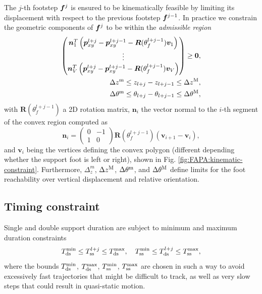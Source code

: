 The $j$-th footstep ${\bm{f}}^{j}$ is ensured to be kinematically feasible by limiting its displacement with respect to the previous footstep ${\bm{f}}^{j-1}$. In practice we constrain the geometric components of ${\bm{f}}^{j}$ to be within the \textit{admissible region}
\begin{equation}
\label{eq:FAPA:kinematic-constraint}
\begin{split}
\begin{pmatrix}
    \bm{n}_1^T\left(\bm{p}_{xy}^{l+j} - \bm{p}_{xy}^{l+j-1} - \bm{R}(\theta_f^{l+j-1})\bm{v}_1\right) \\
    \vdots \\
    \bm{n}_V^T\left(\bm{p}_{xy}^{l+j} - \bm{p}_{xy}^{l+j-1} - \bm{R}(\theta_f^{l+j-1})\bm{v}_V\right) \\
\end{pmatrix} \ge \bm{0},\\
    \Delta z^{\rm m} \le z_{l+j} - z_{l+j-1} \le \Delta z^{\rm M}, \\
    \Delta \theta^{\rm m} \le \theta_{l+j} - \theta_{l+j-1} \le \Delta \theta^{\rm M}, 
\end{split}
\end{equation}
with $\bm{R}(\theta_f^{l+j-1})$ a 2D rotation matrix, $\bm{n}_i$ the vector normal to the $i$-th segment of the convex region computed as
\begin{equation*}
    \bm{n}_i =
    \begin{pmatrix}
        0 & -1 \\ 1 & 0
    \end{pmatrix}
    \bm{R}(\theta_f^{l+j-1})(\bm{v}_{i+1}-\bm{v}_i),
\end{equation*}
and $\bm{v}_i$ being the vertices defining the convex polygon (different depending whether the support foot is left or right), shown in Fig. \ref{fig:FAPA:kinematic-constraint}. Furthermore, $\Delta_z^m$, $\Delta z^{\rm M}$, $\Delta \theta^{\rm m}$, and $\Delta \theta^{\rm M}$ define limits for the foot reachability over vertical displacement and relative orientation.

\subsection{Timing constraint}
Single and double support duration are subject to minimum and maximum duration constraints
\begin{equation}
    T_{\rm ds}^{\min} \le T_{\rm ss}^{l+j} \le T_{\rm ds}^{\max}, \quad T_{\rm ss}^{\min} \le T_{\rm ds}^{l+j} \le T_{\rm ss}^{\max},
    \label{eq:FAPA:timing-constraint}
\end{equation}
where the bounds $T_{\rm ds}^{\min}$, $T_{\rm ds}^{\max}$, $T_{\rm ss}^{\min}$, $T_{\rm ss}^{\max}$ are chosen in such a way to avoid excessively fast trajectories that might be difficult to track, as well as very slow steps that could result in quasi-static motion.

